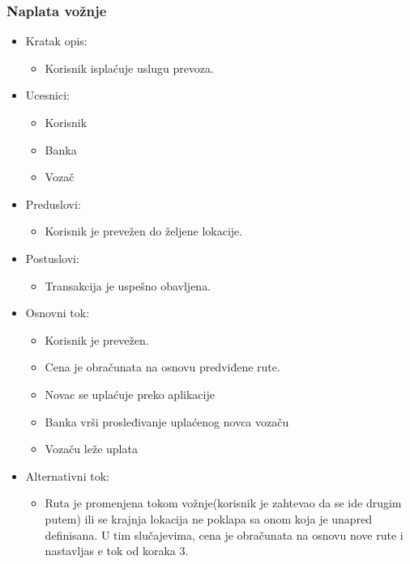 \subsubsection{\bfseries Naplata vo\v znje}
\begin{itemize}
	\item Kratak opis:
		\begin{itemize}
			\item Korisnik isplaćuje uslugu prevoza.
		\end{itemize}
 
	\item Ucesnici:
		\begin{itemize}
			\item Korisnik
			\item Banka
			\item Vozač
		\end{itemize}				

	\item Preduslovi:
		\begin{itemize}
		    \item Korisnik je prevežen do željene lokacije.
		\end{itemize}

	\item Postuslovi:
		\begin{itemize}
			\item Transakcija je uspešno obavljena.
		\end{itemize}		


	\item Osnovni tok:
		\begin{itemize}
		    \item Korisnik je prevežen.
		    \item Cena je obračunata na osnovu predviđene rute.
		    \item Novac se uplaćuje preko aplikacije
		    \item Banka vrši prosleđivanje uplaćenog novca  vozaču
		    \item Vozaču leže uplata
		     
		\end{itemize}

	\item Alternativni tok:
		\begin{itemize}
    		\item Ruta je promenjena tokom vožnje(korisnik je zahtevao da se ide drugim putem) ili se krajnja lokacija ne poklapa sa onom koja je unapred definisana. U tim slučajevima, cena je obračunata na osnovu nove rute i nastavljas e tok od koraka 3.
		\end{itemize}
\end{itemize}

